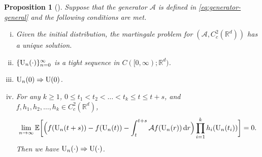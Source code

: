 \documentclass[11pt]{article}
\theoremstyle{plain}
\newtheorem{prop}{Proposition}[section]
\theoremstyle{definition}
\newcommand{\inner}[2]{\langle #1, #2 \rangle}
\def\d{\mathrm{d}}
\def\AM{{\mathcal A}}
\def\RB{{\mathbb R}}
\def\EB{{\mathbb E}}
\def\tr{\mathrm{tr}}
\newcommand{\uu}{{\textnormal{U}}}
\def\weakconverge{\Rightarrow}
\begin{document}
\begin{prop}[{\citealp[Chapter~4, Theorem~8.10]{ethier2009markov}}]\label{prop:mart-prob-approx}
	Suppose that the generator $\AM$ is defined in \eqref{eq:generator-general} and the following conditions are met. 
	\begin{enumerate}[(i)]
		\item \label{prop:final:condition:unique} Given the initial distribution, the martingale problem for $(\AM, C_c^2(\RB^d))$ has a unique solution.
		\item \label{prop:final:condition:tight} $\{ \uu_{n}(\cdot) \}_{n=0}^\infty$ is a tight sequence in $C([0, \infty); \RB^d)$.
		\item \label{prop:final:condition:initial}  $\uu_{n}(0) \weakconverge \uu(0)$.
		\item \label{prop:final:condition:mart-prob} For any $k \ge 1$, $0 \le t_1 < t_2 < \dots < t_k \le t \le t+s $, and $f, h_1, h_2, \dots, h_k \in C_c^2(\RB^d)$,
		\begin{equation}\label{eq:generator-condition}
			\lim_{n \to \infty} \EB  \bigg[ \Big( f(\uu_{n}(t+s)) - f(\uu_{n}(t)) - \int_t^{t+s} \AM f(\uu_{n}(r)) \,\d r \Big) \prod_{i=1}^k h_i(\uu_{n}(t_i)) \bigg]  = 0.
		\end{equation}
	Then we have $\uu_{n}(\cdot) \weakconverge \uu(\cdot)$.
	\end{enumerate}
\end{prop}
\end{document}
